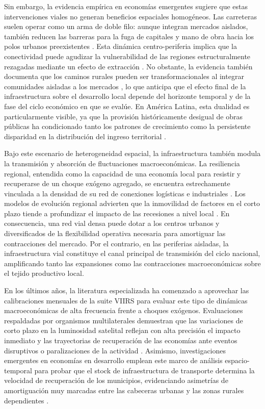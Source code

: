 \documentclass[
  spanish,
  12pt,
  letterpaper]{article}
\begin{document}
Sin embargo, la evidencia empírica en economías emergentes sugiere que
estas intervenciones viales no generan beneficios espaciales homogéneos.
Las carreteras suelen operar como un arma de doble filo: aunque integran
mercados aislados, también reducen las barreras para la fuga de
capitales y mano de obra hacia los polos urbanos preexistentes
\parencite{faber2014trade, baum2020does, banerjee2020road}. Esta
dinámica centro-periferia implica que la conectividad puede agudizar la
vulnerabilidad de las regiones estructuralmente rezagadas mediante un
efecto de extracción \parencite{kline2014local}. No obstante, la
evidencia también documenta que los caminos rurales pueden ser
transformacionales al integrar comunidades aisladas a los mercados
\parencite{asher2020rural}, lo que anticipa que el efecto final de la
infraestructura sobre el desarrollo local depende del horizonte temporal
y de la fase del ciclo económico en que se evalúe. En América Latina,
esta dualidad es particularmente visible, ya que la provisión
históricamente desigual de obras públicas ha condicionado tanto los
patrones de crecimiento como la persistente disparidad en la
distribución del ingreso territorial
\parencite{calderon2004effects, cepal2015desarrollo}.

Bajo este escenario de heterogeneidad espacial, la infraestructura
también modula la transmisión y absorción de fluctuaciones
macroeconómicas. La resiliencia regional, entendida como la capacidad de
una economía local para resistir y recuperarse de un choque exógeno
agregado, se encuentra estrechamente vinculada a la densidad de su red
de conexiones logísticas e industriales \parencite{martin2012regional}.
Los modelos de evolución regional advierten que la inmovilidad de
factores en el corto plazo tiende a profundizar el impacto de las
recesiones a nivel local \parencite{blanchard1992regional}. En
consecuencia, una red vial densa puede dotar a los centros urbanos y
diversificados de la flexibilidad operativa necesaria para amortiguar
las contracciones del mercado. Por el contrario, en las periferias
aisladas, la infraestructura vial constituye el canal principal de
transmisión del ciclo nacional, amplificando tanto las expansiones como
las contracciones macroeconómicas sobre el tejido productivo local.

En los últimos años, la literatura especializada ha comenzado a
aprovechar las calibraciones mensuales de la suite VIIRS para evaluar
este tipo de dinámicas macroeconómicas de alta frecuencia frente a
choques exógenos. Evaluaciones respaldadas por organismos multilaterales
demuestran que las variaciones de corto plazo en la luminosidad
satelital reflejan con alta precisión el impacto inmediato y las
trayectorias de recuperación de las economías ante eventos disruptivos o
paralizaciones de la actividad \parencite{idb2024shining}. Asimismo,
investigaciones emergentes en economías en desarrollo emplean este marco
de análisis espacio-temporal para probar que el stock de infraestructura
de transporte determina la velocidad de recuperación de los municipios,
evidenciando asimetrías de amortiguación muy marcadas entre las
cabeceras urbanas y las zonas rurales dependientes
\parencite{sun2024measurement}.
\end{document}
